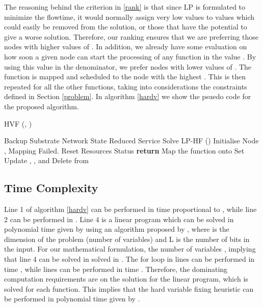 \documentclass[conference]{IEEEtran}
\begin{document}
The reasoning behind the  criterion in \eqref{rank} is that since LP is formulated to minimize the flowtime, it would normally assign very low values to values  which could easily be removed from the solution, or those that have the potential to give a worse solution. Therefore, our ranking ensures that we are preferring those nodes with higher values of . In addition, we already have some evaluation on how soon a given node can start the processing of any function in the value . By using this value in the denominator, we prefer nodes with lower values of . The function is mapped and scheduled to the node with the highest . This is then repeated for all the other functions, taking into considerations the constraints defined in Section \ref{problem}. In algorithm \ref{hardv} we show the psuedo code for the proposed algorithm.


\begin{algorithm}[t]
\caption{HVF (, )}
\label{hardv}
\begin{algorithmic}[1]
\STATE Backup Substrate Network State
\STATE Reduced Service 
\STATE Solve LP-HF ()
\IF{()}
\STATE 
\ENDIF
\STATE Initialise Node , 
\STATE 
{}		
\IF{\Big(      (  )\Big)}
\STATE 
\ENDIF
\ENDFOR
\ENDFOR
\IF{}
\STATE Mapping Failed. Reset Resources Status
\STATE \textbf{return}
\ENDIF
\STATE Map the function  onto 
\STATE Set 
\STATE Update , , and 
\STATE Delete  from 
\ENDFOR
\end{algorithmic}
\end{algorithm}

\subsection{Time Complexity}

Line 1 of algorithm \ref{hardv} can be performed in time proportional to , while line 2 can be performed in . Line 4 is a linear program which can be solved in polynomial time given by  using an algorithm proposed by \cite{Karmarkar84}, where  is the dimension of the problem (number of variables) and L is the number of bits in the input. For our mathematical formulation, the number of variables , implying that line 4 can be solved in solved in . The for loop in lines  can be performed in time , while lines  can be performed in time . Therefore, the dominating computation requirements are on the solution for the linear program, which is solved for each function. This implies that the hard variable fixing heuristic can be performed in polynomial time given by .
\end{document}
